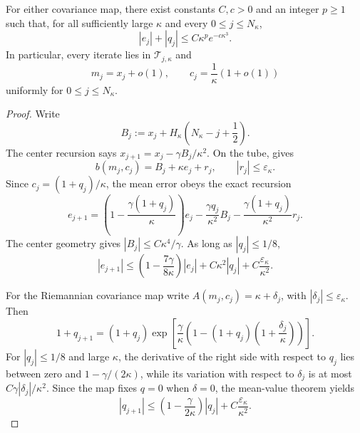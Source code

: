 \begin{lemma}
\label{app:bump:shadowing}
For either covariance map, there exist constants \(C,c>0\) and an
integer \(p\geq1\) such that, for all sufficiently large \(\kappa\) and
every \(0\leq j\leq N_\kappa\),
\begin{equation}
\label{app:bump:shadowing-estimate}
    |e_j|+|q_j|\leq C\kappa^p e^{-c\kappa^3}.
\end{equation}
In particular, every iterate lies in \(\mathcal T_{j,\kappa}\) and
\[
    m_j=x_j+o(1),
    \qquad
    c_j=\frac1\kappa(1+o(1))
\]
uniformly for \(0\leq j\leq N_\kappa\).
\end{lemma}

\begin{proof}
Write
\[
    B_j:=x_j+H_\kappa\left(N_\kappa-j+\frac12\right).
\]
The center recursion says
\(x_{j+1}=x_j-\gamma B_j/\kappa^2\).  On the tube,
 gives
\[
    b(m_j,c_j)=B_j+\kappa e_j+r_j,
    \qquad
    |r_j|\leq\varepsilon_\kappa.
\]
Since \(c_j=(1+q_j)/\kappa\), the mean error obeys the exact recursion
\begin{equation}
\label{app:bump:mean-error-recursion}
    e_{j+1}
    =\left(1-\frac{\gamma(1+q_j)}{\kappa}\right)e_j
      -\frac{\gamma q_j}{\kappa^2}B_j
      -\frac{\gamma(1+q_j)}{\kappa^2}r_j.
\end{equation}
The center geometry gives \(|B_j|\leq C\kappa^4/\gamma\).  As long as
\(|q_j|\leq1/8\),
\begin{equation}
\label{app:bump:mean-error-bound}
    |e_{j+1}|
    \leq
    \left(1-\frac{7\gamma}{8\kappa}\right)|e_j|
    +C\kappa^2|q_j|
    +C\frac{\varepsilon_\kappa}{\kappa^2}.
\end{equation}

For the Riemannian covariance map write
\(A(m_j,c_j)=\kappa+\delta_j\), with
\(|\delta_j|\leq\varepsilon_\kappa\).  Then
\begin{equation}
\label{app:bump:q-riemannian-exact}
    1+q_{j+1}
    =(1+q_j)
      \exp\left[
        \frac{\gamma}{\kappa}
        \left(
            1-(1+q_j)\left(1+\frac{\delta_j}{\kappa}\right)
        \right)
      \right].
\end{equation}
For \(|q_j|\leq1/8\) and large \(\kappa\), the derivative of the right
side with respect to \(q_j\) lies between zero and
\(1-\gamma/(2\kappa)\), while its variation with respect to
\(\delta_j\) is at most \(C\gamma|\delta_j|/\kappa^2\).  Since the map
fixes \(q=0\) when \(\delta=0\), the mean-value theorem yields
\begin{equation}
\label{app:bump:q-riemannian-bound}
    |q_{j+1}|
    \leq\left(1-\frac{\gamma}{2\kappa}\right)|q_j|
    +C\frac{\varepsilon_\kappa}{\kappa^2}.
\end{equation}


\end{proof}
